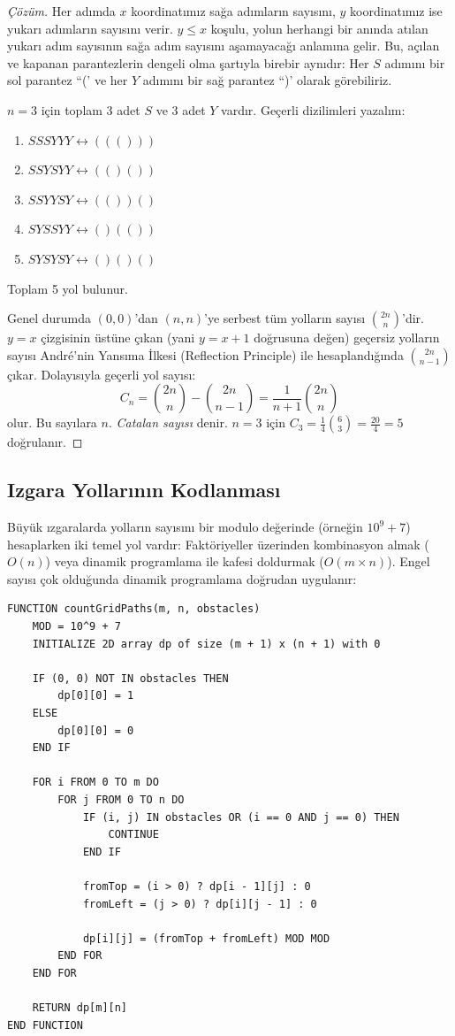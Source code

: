 \begin{proof}[Çözüm]
Her adımda $x$ koordinatımız sağa adımların sayısını, $y$ koordinatımız ise yukarı adımların sayısını verir. $y \le x$ koşulu, yolun herhangi bir anında atılan yukarı adım sayısının sağa adım sayısını aşamayacağı anlamına gelir. Bu, açılan ve kapanan parantezlerin dengeli olma şartıyla birebir aynıdır: Her $S$ adımını bir sol parantez ``(' ve her $Y$ adımını bir sağ parantez ``)' olarak görebiliriz.

$n=3$ için toplam 3 adet $S$ ve 3 adet $Y$ vardır. Geçerli dizilimleri yazalım:
\begin{enumerate}
    \item $SSSYYY \longleftrightarrow ((()))$
    \item $SSYSYY \longleftrightarrow (()())$
    \item $SSYY SY \longleftrightarrow (())()$
    \item $SYSSYY \longleftrightarrow ()(())$
    \item $SYSYSY \longleftrightarrow ()()()$
\end{enumerate}
Toplam 5 yol bulunur. 

Genel durumda $(0,0)$'dan $(n,n)$'ye serbest tüm yolların sayısı $\binom{2n}{n}$'dir. $y=x$ çizgisinin üstüne çıkan (yani $y=x+1$ doğrusuna değen) geçersiz yolların sayısı André'nin Yansıma İlkesi (Reflection Principle) ile hesaplandığında $\binom{2n}{n-1}$ çıkar. Dolayısıyla geçerli yol sayısı:
\[
C_n = \binom{2n}{n} - \binom{2n}{n-1} = \frac{1}{n+1}\binom{2n}{n}
\]
olur. Bu sayılara $n$. \emph{Catalan sayısı} denir. $n=3$ için $C_3 = \frac{1}{4}\binom{6}{3} = \frac{20}{4} = 5$ doğrulanır.
\end{proof}

\subsection{Izgara Yollarının Kodlanması}

Büyük ızgaralarda yolların sayısını bir modulo değerinde (örneğin $10^9+7$) hesaplarken iki temel yol vardır: Faktöriyeller üzerinden kombinasyon almak ($O(n)$) veya dinamik programlama ile kafesi doldurmak ($O(m \times n)$). Engel sayısı çok olduğunda dinamik programlama doğrudan uygulanır:

\begin{lstlisting}
FUNCTION countGridPaths(m, n, obstacles)
    MOD = 10^9 + 7
    INITIALIZE 2D array dp of size (m + 1) x (n + 1) with 0

    IF (0, 0) NOT IN obstacles THEN
        dp[0][0] = 1
    ELSE
        dp[0][0] = 0
    END IF

    FOR i FROM 0 TO m DO
        FOR j FROM 0 TO n DO
            IF (i, j) IN obstacles OR (i == 0 AND j == 0) THEN
                CONTINUE
            END IF

            fromTop = (i > 0) ? dp[i - 1][j] : 0
            fromLeft = (j > 0) ? dp[i][j - 1] : 0

            dp[i][j] = (fromTop + fromLeft) MOD MOD
        END FOR
    END FOR

    RETURN dp[m][n]
END FUNCTION\end{lstlisting}

